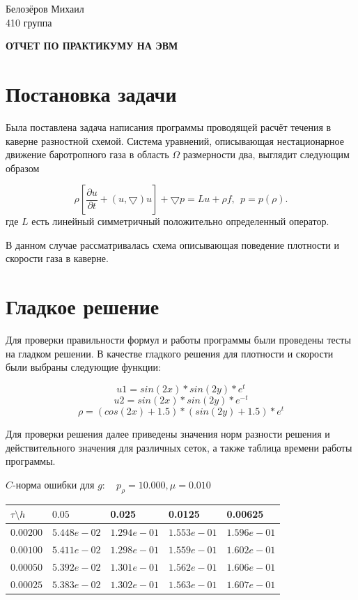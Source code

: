 \documentclass[a4paper, 25pt]{article}
\begin{document}
\begin{flushright}
Белозёров Михаил
\\
410 группа
\end{flushright}

\begin{center}
\bfseries ОТЧЕТ ПО ПРАКТИКУМУ НА ЭВМ
\end{center}

\section{Постановка задачи}

Была поставлена задача написания программы проводящей расчёт течения в каверне разностной схемой. 
Система уравнений, описывающая нестационарное движение баротропного газа в область $\Omega$ размерности два, выглядит следующим образом

\begin{equation}
 \rho[\frac{\partial u}{\partial t} + (u, \bigtriangledown)u]  + \bigtriangledown p = Lu + \rho f, ~~
 p = p (\rho).
\end{equation}
где $L$ есть линейный симметричный положительно определенный оператор.

В данном случае рассматривалась схема описывающая поведение плотности и скорости газа в каверне.

\section{Гладкое решение}

Для проверки правильности формул и работы программы были проведены тесты на гладком решении. В качестве гладкого решения для плотности и скорости были выбраны следующие функции:

$$u1 = sin (2x) * sin (2y) * e^t$$
$$u2 = sin (2x) * sin (2y) * e^{-t}$$
$$\rho = (cos (2x) + 1.5) * (sin (2y) + 1.5) * e^t$$


Для проверки решения далее приведены значения норм разности решения и действительного значения для различных сеток, а также таблица времени работы программы.

\begin{center}
 $C$-норма ошибки для $g: \quad p_{\rho}=10.000, \mu = 0.010 $
\begin{tabular}{|p{0.6in}|p{0.7in}|p{0.7in}|p{0.7in}|p{0.7in}|} \hline
$\tau\setminus h$ & $0.05$ & 0.025& 0.0125 & 0.00625 \\ \hline
$0.00200$ & $5.448e-02$ &$1.294e-01$ &$1.553e-01$ &$1.596e-01$  \\ \hline
$0.00100$ & $5.411e-02$ &$1.298e-01$ &$1.559e-01$ &$1.602e-01$  \\ \hline
$0.00050$ & $5.392e-02$ &$1.301e-01$ &$1.562e-01$ &$1.606e-01$  \\ \hline
$0.00025$ & $5.383e-02$ &$1.302e-01$ &$1.563e-01$ &$1.607e-01$  \\ \hline
\end{tabular}\\[20pt]
\end{center}
\end{document}
